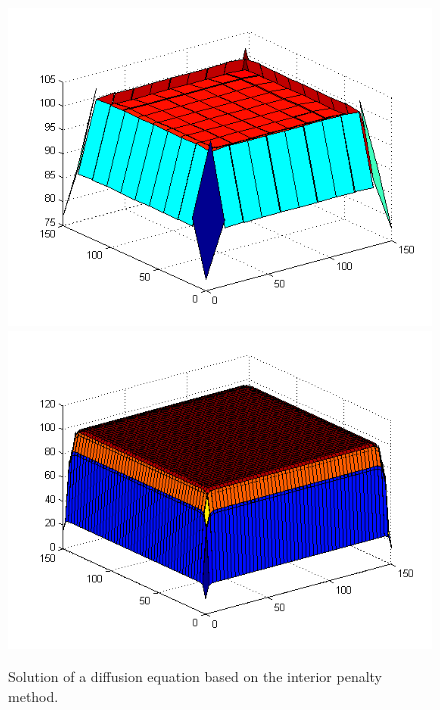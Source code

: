 \documentclass{mc2013}
\renewcommand{\(}{\left(}
\renewcommand{\)}{\right)}
\renewcommand{\[}{\left[}
\renewcommand{\]}{\right]}
\begin{document}
\begin{figure}[!hbtp]
\begin{center}
\includegraphics[scale=0.45]{IP10x10}
\includegraphics[scale=0.45]{IP50x50}
\end{center}
\caption{Solution of a diffusion equation based on the interior penalty method.}
\label{fig:ip}
\end{figure}
 \label{sec:transport}
\end{document}
